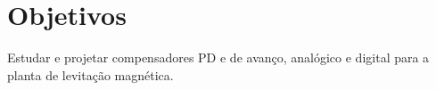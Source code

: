 \section{Objetivos}
Estudar e projetar compensadores PD e de avanço, analógico e digital para a planta de levitação magnética.